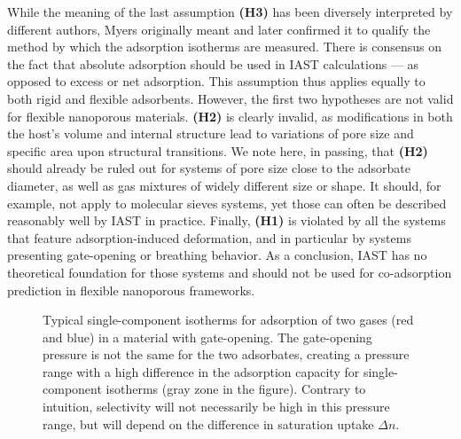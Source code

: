 \documentclass[thesis]{subfiles}
\begin{document}
While the meaning of the last assumption \textbf{(H3)} has been diversely
interpreted by different authors, Myers originally meant\cite{Myers1965} and
later confirmed\cite{Myers2014} it to qualify the method by which the adsorption
isotherms are measured. There is consensus on the fact that absolute
adsorption should be used in IAST calculations --- as opposed to excess or net
adsorption\cite{Brandani2016}. This assumption thus applies equally to both
rigid and flexible adsorbents. However, the first two hypotheses are not valid
for flexible nanoporous materials. \textbf{(H2)} is clearly invalid, as
modifications in both the host's volume and internal structure lead to
variations of pore size and specific area upon structural transitions. We note
here, in passing, that \textbf{(H2)} should already be ruled out for systems of
pore size close to the adsorbate diameter, as well as gas mixtures of widely
different size or shape. It should, for example, not apply to molecular sieves
systems, yet those can often be described reasonably well by IAST in practice.
Finally, \textbf{(H1)} is violated by all the systems that feature
adsorption-induced deformation, and in particular by systems presenting
gate-opening or breathing behavior. As a conclusion, IAST has no theoretical
foundation for those systems and should not be used for co-adsorption prediction
in flexible nanoporous frameworks.

\begin{figure}[htp]
    \centering
    
    \caption{Typical single-component isotherms for adsorption of two gases (red
    and blue) in a material with gate-opening. The gate-opening pressure is not
    the same for the two adsorbates, creating a pressure range with a high
    difference in the adsorption capacity for single-component isotherms (gray
    zone in the figure). Contrary to intuition, selectivity will not necessarily
    be high in this pressure range, but will depend on the difference in saturation
    uptake $\Delta n$.}
    \label{fig:open-close-selectivity}
\end{figure}
\end{document}
